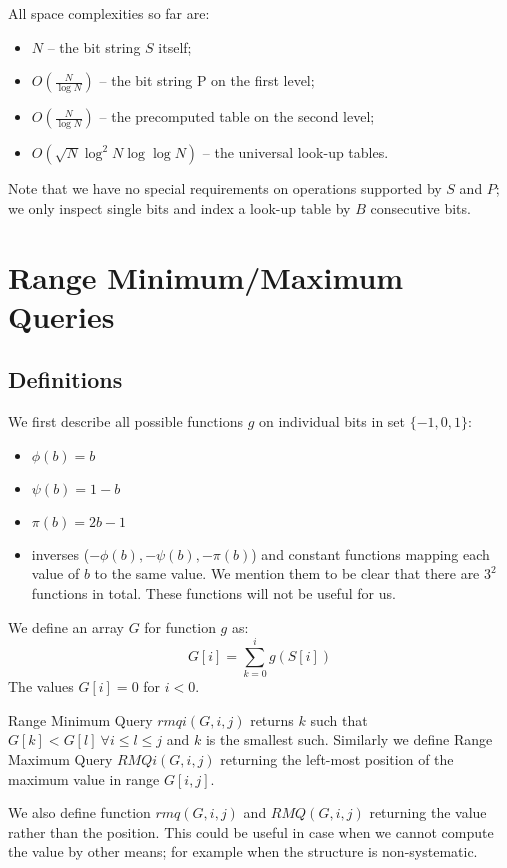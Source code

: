 \bigskip

All space complexities so far are:
\begin{itemize}
	\item $N$ -- the bit string $S$ itself;
	\item $O(\frac{N}{\log N})$ -- the bit string P on the first level;
	\item $O(\frac{N}{\log N})$ -- the precomputed table on the second level;
	\item $O(\sqrt{N}\log^2 N \log\log N)$ -- the universal look-up tables.
\end{itemize}
Note that we have no special requirements on operations supported by $S$ and $P$; we only inspect single bits and index a look-up table by $B$ consecutive bits.


\section{Range Minimum/Maximum Queries}


\subsection{\label{ss:rmq-def}Definitions}

We first describe all possible functions $g$ on individual bits in set $\{-1, 0, 1\}$:
\begin{itemize}
	\item $\phi(b) = b$
	\item $\psi(b) = 1 - b$
	\item $\pi(b) = 2 b - 1$
	\item inverses ($-\phi(b), -\psi(b), -\pi(b)$) and constant functions mapping each value of $b$ to the same value.
	We mention them to be clear that there are $3^2$ functions in total.
	These functions will not be useful for us.
\end{itemize}

We define an array $G$ for function $g$ as:
$$G[i] = \sum_{k=0}^i g(S[i])$$
The values $G[i] = 0$ for $i < 0$.

\begin{defn}
Range Minimum Query $rmqi(G, i, j)$ returns $k$ such that $G[k] < G[l]\ \forall i \le l \le j$ and $k$ is the smallest such.
Similarly we define Range Maximum Query $RMQi(G, i, j)$ returning the left-most position of the maximum value in range $G[i, j]$.

We also define function $rmq(G, i, j)$ and $RMQ(G, i, j)$ returning the value rather than the position.
This could be useful in case when we cannot compute the value by other means; for example when the structure is non-systematic.
\end{defn}

